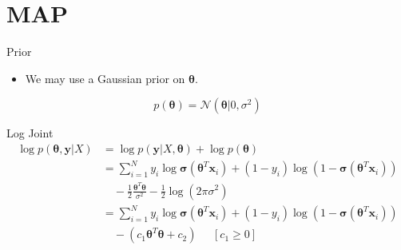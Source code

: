 \documentclass{beamer}
\begin{document}
\section{MAP}

\begin{frame}{Prior}
    \begin{itemize}
        \item We may use a Gaussian prior on $\boldsymbol{\theta}$.
    \end{itemize}

    \begin{equation*}
        p(\boldsymbol{\theta}) = \mathcal{N}(\boldsymbol{\theta} | 0, \sigma^2)
    \end{equation*}

\end{frame}

\begin{frame}{Log Joint}
    \begin{align*}
        \log p(\boldsymbol{\theta}, \boldsymbol{y} | X) & = \log p(\boldsymbol{y} | X, \boldsymbol{\theta}) + \log p(\boldsymbol{\theta})                                                                                                                       \\
                                                        & = \sum_{i=1}^N y_i \log \boldsymbol{\sigma}\left(\boldsymbol{\theta}^T\boldsymbol{x}_i\right) + (1 - y_i) \log \left(1 - \boldsymbol{\sigma}\left(\boldsymbol{\theta}^T\boldsymbol{x}_i\right)\right) \\
                                                        & \quad  - \frac{1}{2} \frac{\boldsymbol{\theta}^T\boldsymbol{\theta}}{\sigma^2} - \frac{1}{2}\log (2 \pi \sigma^2)                                                                                     \\
                                                        & = \sum_{i=1}^N y_i \log \boldsymbol{\sigma}\left(\boldsymbol{\theta}^T\boldsymbol{x}_i\right) + (1 - y_i) \log \left(1 - \boldsymbol{\sigma}\left(\boldsymbol{\theta}^T\boldsymbol{x}_i\right)\right) \\
                                                        & \quad - \left(c_1 \boldsymbol{\theta}^T\boldsymbol{\theta} + c_2\right) \;\;\;\;\; [c_1 \ge 0]                                                                                                        \\
    \end{align*}
\end{frame}
\end{document}
